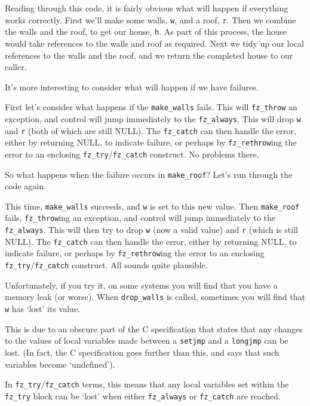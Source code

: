 \documentclass[oneside]{book}
\begin{document}
Reading through this code, it is fairly obvious what will happen if everything works correctly. First we'll make some walls, \texttt{w}, and a roof, \texttt{r}. Then we combine the walls and the roof, to get our house, \texttt{h}. As part of this process, the house would take references to the walls and roof as required. Next we tidy up our local references to the walls and the roof, and we return the completed house to our caller.

It's more interesting to consider what will happen if we have failures.

First let's consider what happens if the \texttt{make\_walls} fails. This will \texttt{fz\_throw} an exception, and control will jump immediately to the \texttt{fz\_always}. This will drop \texttt{w} and \texttt{r} (both of which are still NULL). The \texttt{fz\_catch} can then handle the error, either by returning NULL, to indicate failure, or perhaps by \texttt{fz\_rethrow}ing the error to an enclosing \texttt{fz\_try}\slash \texttt{fz\_catch} construct. No problems there.

So what happens when the failure occurs in \texttt{make\_roof}? Let's run through the code again.

This time, \texttt{make\_walls} succeeds, and \texttt{w} is set to this new value. Then \texttt{make\_roof} fails, \texttt{fz\_throw}ing an exception, and control will jump immediately to the \texttt{fz\_always}. This will then try to drop \texttt{w} (now a valid value) and \texttt{r} (which is still NULL). The \texttt{fz\_catch} can then handle the error, either by returning NULL, to indicate failure, or perhaps by \texttt{fz\_rethrow}ing the error to an enclosing \texttt{fz\_try}\slash\texttt{fz\_catch} construct. All sounds quite plausible.

Unfortunately, if you try it, on some systems you will find that you have a memory leak (or worse). When \texttt{drop\_walls} is called, sometimes you will find that \texttt{w} has `lost' its value.

This is due to an obscure part of the C specification that states that any changes to the values of local variables made between a \texttt{setjmp} and a \texttt{longjmp} can be lost. (In fact, the C specification goes further than this, and says that such variables become `undefined').

In \texttt{fz\_try}\slash \texttt{fz\_catch} terms, this means that any local variables set within the \texttt{fz\_try} block can be `lost' when either \texttt{fz\_always} or \texttt{fz\_catch} are reached.
\end{document}
